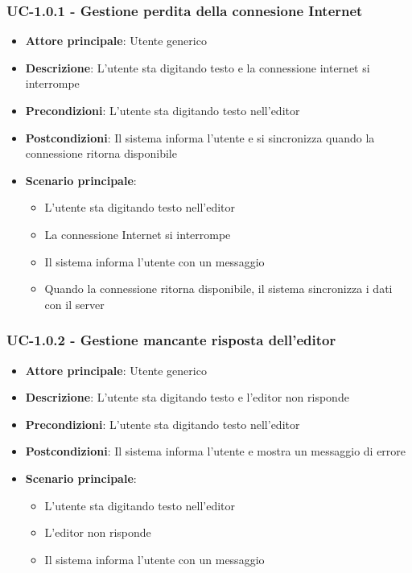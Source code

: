 \documentclass[11pt,a4paper]{article}
\begin{document}
\subsubsection{UC-1.0.1 - Gestione perdita della connesione Internet}
\begin{itemize}
    \item \textbf{Attore principale}: Utente generico
    \item \textbf{Descrizione}: L'utente sta digitando testo e la connessione internet si interrompe
    \item \textbf{Precondizioni}: L'utente sta digitando testo nell'editor
    \item \textbf{Postcondizioni}: Il sistema informa l'utente e si sincronizza quando la connessione ritorna disponibile
    \item \textbf{Scenario principale}:
        \begin{itemize}
            \item L'utente sta digitando testo nell'editor
            \item La connessione Internet si interrompe
            \item Il sistema informa l'utente con un messaggio
            \item Quando la connessione ritorna disponibile, il sistema sincronizza i dati con il server
        \end{itemize}
\end{itemize}

\subsubsection{UC-1.0.2 - Gestione mancante risposta dell'editor}
\begin{itemize}
    \item \textbf{Attore principale}: Utente generico
    \item \textbf{Descrizione}: L'utente sta digitando testo e l'editor non risponde
    \item \textbf{Precondizioni}: L'utente sta digitando testo nell'editor
    \item \textbf{Postcondizioni}: Il sistema informa l'utente e mostra un messaggio di errore
    \item \textbf{Scenario principale}:
        \begin{itemize}
            \item L'utente sta digitando testo nell'editor
            \item L'editor non risponde
            \item Il sistema informa l'utente con un messaggio
        \end{itemize}
\end{itemize}
\end{document}
